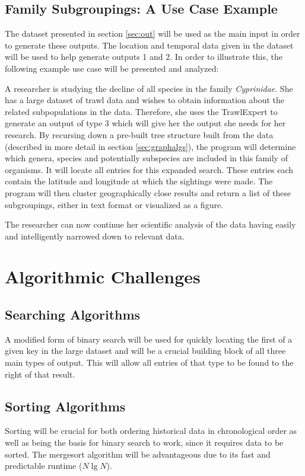 \documentclass{article}
\begin{document}
\subsection{Family Subgroupings: A Use Case Example}\label{sec:case}
The dataset presented in section \ref{sec:out} will be used as the main input in order to generate these outputs. The location and temporal data given in the dataset will be used to help generate outputs 1 and 2. In order to illustrate this, the following example use case will be presented and analyzed:

A researcher is studying the decline of all species in the family \textit{Cyprinidae}. She has a large dataset of trawl data and wishes to obtain information about the related subpopulations in the data. Therefore, she uses the TrawlExpert to generate an output of type 3 which will give her the output she needs for her research. By recursing down a pre-built tree structure built from the data (described in more detail in section \ref{sec:graphalgs}), the program will determine which genera, species and potentially subspecies are included in this family of organisms. It will locate all entries for this expanded search. These entries each contain the latitude and longitude at which the sightings were made. The program will then cluster geographically close results and return a list of these subgroupings, either in text format or visualized as a figure.

The researcher can now continue her scientific analysis of the data having easily and intelligently narrowed down to relevant data.

\section{Algorithmic Challenges}
\subsection{Searching Algorithms}
A modified form of binary search will be used for quickly locating the first of a given key in the large dataset and will be a crucial building block of all three main types of output. This will allow all entries of that type to be found to the right of that result.

\subsection{Sorting Algorithms}
Sorting will be crucial for both ordering historical data in chronological order as well as being the basis for binary search to work, since it requires data to be sorted. The mergesort algorithm will be advantageous due to its fast and predictable runtime ($N\lg N$).
\end{document}
